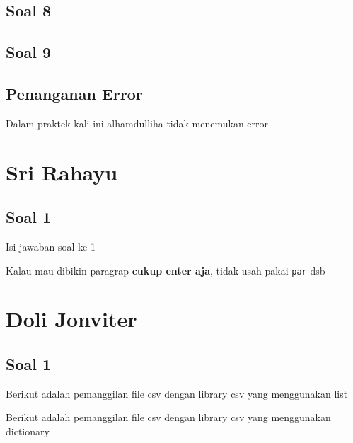 \subsection{Soal 8}


\subsection{Soal 9}


\subsection{Penanganan Error}
Dalam praktek kali ini alhamdulliha tidak menemukan error

\section{Sri Rahayu}
\subsection{Soal 1}
Isi jawaban soal ke-1

Kalau mau dibikin paragrap \textbf{cukup enter aja}, tidak usah pakai \verb|par| dsb



\section{Doli Jonviter}
\subsection{Soal 1}
\item Berikut adalah pemanggilan file csv dengan library csv yang menggunakan list


\item Berikut adalah pemanggilan file csv dengan library csv yang menggunakan dictionary


